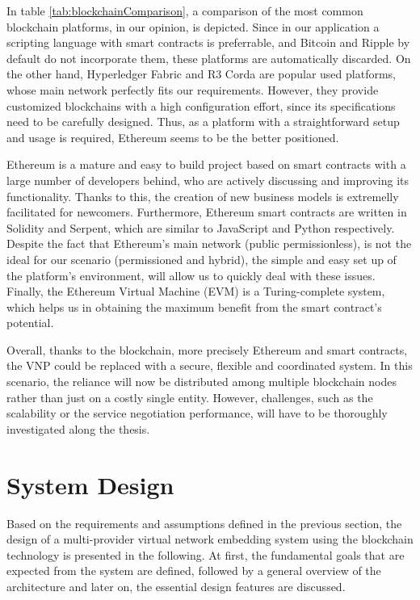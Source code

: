 In table \ref{tab:blockchainComparison}, a comparison of the most common blockchain platforms, in our opinion, is depicted. Since in our application a scripting language with smart contracts is preferrable, and Bitcoin and Ripple by default do not incorporate them, these platforms are automatically discarded. On the other hand, Hyperledger Fabric and R3 Corda are popular used platforms, whose main network perfectly fits our requirements. However, they provide customized blockchains with a high configuration effort, since its specifications need to be carefully designed. Thus, as a platform with a straightforward setup and usage is required, Ethereum seems to be the better positioned.

Ethereum is a mature and easy to build project based on smart contracts with a large number of developers behind, who are actively discussing and improving its functionality. Thanks to this, the creation of new business models is extremelly facilitated for newcomers. Furthermore, Ethereum smart contracts are written in Solidity and Serpent, which are similar to JavaScript and Python respectively. Despite the fact that Ethereum's main network (public permissionless), is not the ideal for our scenario (permissioned and hybrid), the simple and easy set up of the platform's environment, will allow us to quickly deal with these issues. Finally, the Ethereum Virtual Machine (EVM) is a Turing-complete system, which helps us in obtaining the maximum benefit from the smart contract's potential.

Overall, thanks to the blockchain, more precisely Ethereum and smart contracts, the VNP could be replaced with a secure, flexible and coordinated system. In this scenario, the reliance will now be distributed among multiple blockchain nodes rather than just on a costly single entity. However, challenges, such as the scalability or the service negotiation performance, will have to be thoroughly investigated along the thesis.

\section{System Design}

Based on the requirements and assumptions defined in the previous section, the design of a multi-provider virtual network embedding system using the blockchain technology is presented in the following. At first, the fundamental goals that are expected from the system are defined, followed by a general overview of the architecture and later on, the essential design features are discussed.

